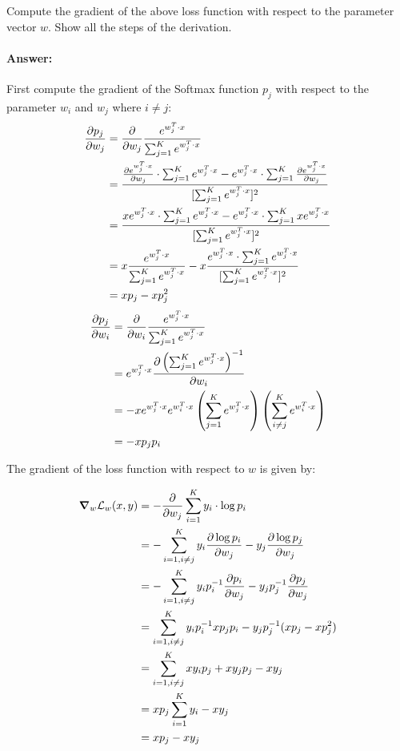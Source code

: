\documentclass[10pt]{article}
\begin{document}
Compute the gradient of the above loss function with respect to the parameter vector $w$. Show all the steps of the derivation.

\paragraph{Answer:} First compute the gradient of the Softmax function $p_j$ with respect to the parameter $w_i$ and $w_j$ where $i\neq j$:
\begin{align*}
  \pdv{p_j}{w_j} &=\pdv{}{w_j}\frac{e^{w_{j}^{T} \cdot x}}{\sum_{j=1}^{K} e^{w_{j}^{T} \cdot x}}\\
  &=\frac{\pdv{e^{w_{j}^{T} \cdot x}}{w_j}\cdot \sum_{j=1}^{K} e^{w_{j}^{T} \cdot x}-e^{w_{j}^{T} \cdot x} \cdot \sum_{j=1}^{K} \pdv{e^{w_{j}^{T} \cdot x}}{w_j}}{[\sum_{j=1}^{K} e^{w_{j}^{T} \cdot x}]^2}\\
  &=\frac{x e^{w_{j}^{T} \cdot x } \cdot \sum_{j=1}^{K} e^{w_{j}^{T} \cdot x}-e^{w_{j}^{T} \cdot x} \cdot \sum_{j=1}^{K} x e^{w_{j}^{T} \cdot x }}{[\sum_{j=1}^{K} e^{w_{j}^{T} \cdot x}]^2}\\
  &=x\frac{e^{w_{j}^{T} \cdot x }}{\sum_{j=1}^{K} e^{w_{j}^{T} \cdot x}}- x \frac{e^{w_{j}^{T} \cdot x} \cdot \sum_{j=1}^{K} e^{w_{j}^{T} \cdot x }}{[\sum_{j=1}^{K} e^{w_{j}^{T} \cdot x}]^2}\\
  &=x p_{j}- x p^2_{j}\\
\end{align*}
\begin{align*}
  \pdv{p_j}{w_i} &=\pdv{}{w_i}\frac{e^{w_{j}^{T} \cdot x}}{\sum_{j=1}^{K} e^{w_{j}^{T} \cdot x}}\\
  &=e^{w_{j}^{T} \cdot x} \pdv{\left(\sum_{j=1}^{K} e^{w_{j}^{T} \cdot x}\right)^{-1}}{w_i}\\
  &=- x e^{w_{j}^{T} \cdot x} e^{w_{i}^{T} \cdot x} \left(\sum_{j=1}^{K} e^{w_{j}^{T} \cdot x}\right)\left(\sum_{i\neq j}^{K} e^{w_{i}^{T} \cdot x}\right)\\
  &=-x p_j p_i
\end{align*}

The gradient of the loss function with respect to $w$ is given by:

\begin{align*}
  \grad_{w}{\mathcal{L}_{w}(x,y)} &=-\pdv{}{w_j}\sum_{i=1}^{K} y_{i} \cdot \log p_{i}\\
  &=-\sum_{i=1, i\neq j}^{K} y_{i} \pdv{\log p_{i}}{w_j} - y_j \pdv{\log p_{j}}{w_j}\\&=-\sum_{i=1, i\neq j}^{K} y_{i} p_i^{-1} \pdv{p_{i}}{w_j} - y_j p_j^{-1} \pdv{p_{j}}{w_j}  \\
  &=\sum_{i=1, i\neq j}^{K} y_{i} p_i^{-1} x p_j p_i - y_j p_j^{-1} (x p_{j}- x p^2_{j})\\
  &=\sum_{i=1, i\neq j}^{K} x y_{i} p_j + x y_j p_{j} - x y_j \\
  &=x p_j \sum_{i=1}^{K} y_{i} - x y_j\\
  &= x p_j - x y_j
  \end{align*}
\end{document}
